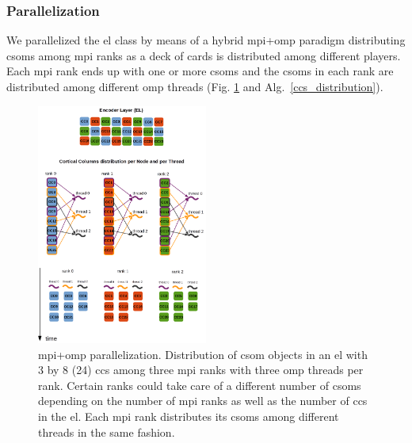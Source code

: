 \documentclass[11pt,a4paper]{article}
\begin{document}
\subsubsection{ Parallelization}

We parallelized the \gls{el} class by means of a hybrid \gls{mpi}+\gls{omp} paradigm distributing \glspl{csom} among \gls{mpi} ranks as a deck of cards is distributed among different players. Each \gls{mpi} rank ends up with one or more \glspl{csom} and the \glspl{csom} in each rank are distributed among different \gls{omp} threads (Fig. \ref{fig:Encoder_Parallelization} and Alg.~\ref{ccs_distribution}).

\begin{algorithm}
	\caption{This algorithm distributes \glspl{cc} among \gls{mpi} processes in a distributed memory system and the \glspl{cc} in each process are distributed among \gls{omp} threads in a shared memory system. In this algorithm we run one \gls{mpi} process per compute node on Cooley.}
\label{ccs_distribution}
\begin{algorithmic}[1]
	\ENDFOR
\end{algorithmic}
\end{algorithm}

\begin{figure}[h!]
    \centering
    \includegraphics[width=0.5\textwidth]{Encoder_Parallelization.png}
    \caption{ \gls{mpi}+\gls{omp} parallelization. Distribution of \gls{csom} objects in an \gls{el} with 3 by 8 (24) \glspl{cc} among three \gls{mpi} ranks with three \gls{omp} threads per rank. Certain ranks could take care of a different number of \glspl{csom} depending on the number of \gls{mpi} ranks as well as the number of \glspl{cc} in the \gls{el}. Each \gls{mpi} rank distributes its \glspl{csom} among different threads in the same fashion.}
    \label{fig:Encoder_Parallelization}
\end{figure}
\end{document}

